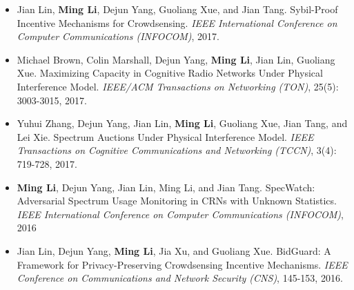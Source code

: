 \begin{itemize}[leftmargin=*]
	\item 
	Jian Lin, \textbf{Ming Li}, Dejun Yang, Guoliang Xue, and Jian Tang. Sybil-Proof Incentive Mechanisms for Crowdsensing. \textit{IEEE International Conference on Computer Communications (INFOCOM)}, 2017.
	
	\item 
	Michael Brown, Colin Marshall, Dejun Yang, \textbf{Ming Li}, Jian Lin, Guoliang Xue. Maximizing Capacity in Cognitive Radio Networks Under Physical Interference Model. \textit{IEEE/ACM Transactions on Networking (TON)}, 25(5): 3003-3015, 2017.
	
	\item 
	Yuhui Zhang, Dejun Yang, Jian Lin, \textbf{Ming Li}, Guoliang Xue, Jian Tang, and Lei Xie. Spectrum Auctions Under Physical Interference Model. \textit{IEEE Transactions on Cognitive Communications and Networking (TCCN)}, 3(4): 719-728, 2017.
	
	\item 
	\textbf{Ming Li}, Dejun Yang, Jian Lin, Ming Li, and Jian Tang. SpecWatch: Adversarial Spectrum Usage Monitoring in CRNs with Unknown Statistics. \textit{IEEE International Conference on Computer Communications (INFOCOM)}, 2016
	
	\item 
	Jian Lin, Dejun Yang, \textbf{Ming Li}, Jia Xu, and Guoliang Xue. BidGuard: A Framework for Privacy-Preserving Crowdsensing Incentive Mechanisms. \textit{IEEE Conference on Communications and Network Security (CNS)}, 145-153, 2016.
	
	
	
	
	
	
	
	
	
	
	
\end{itemize}




